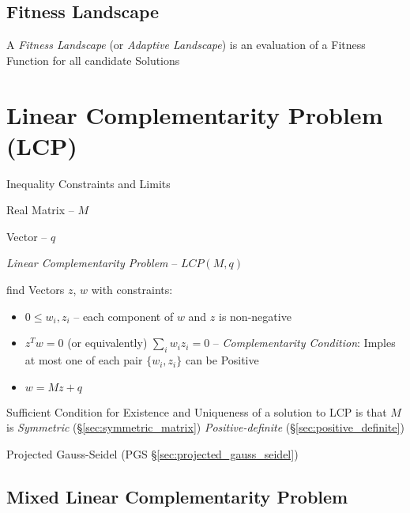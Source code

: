 \subsection{Fitness Landscape}\label{sec:fitness_landscape}

A \emph{Fitness Landscape} (or \emph{Adaptive Landscape}) is an
evaluation of a Fitness Function for all candidate Solutions %



\section{Linear Complementarity Problem (LCP)}
\label{sec:linear_complementarity}


Inequality Constraints and Limits %

Real Matrix -- $M$

Vector -- $q$

\emph{Linear Complementarity Problem} -- $LCP(M,q)$

find Vectors $z$, $w$ with constraints:

\begin{itemize}
  \item $0 \leq w_i,z_i$ -- each component of $w$ and $z$ is
    non-negative
  \item $z^T w = 0$ (or equivalently) $\sum_i w_i z_i = 0$ --
    \emph{Complementarity Condition}: Imples at most one of each pair
    $\{w_i,z_i\}$ can be Positive
  \item $w = M z + q$
\end{itemize}

Sufficient Condition for Existence and Uniqueness of a solution to LCP
is that $M$ is \emph{Symmetric} (\S\ref{sec:symmetric_matrix})
\emph{Positive-definite} (\S\ref{sec:positive_definite})

\fist Projected Gauss-Seidel (PGS \S\ref{sec:projected_gauss_seidel})


\subsection{Mixed Linear Complementarity Problem}\label{sec:mlcp}

